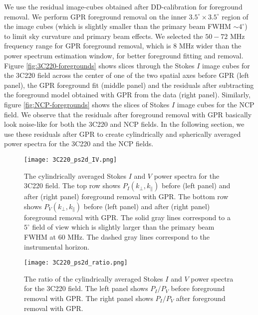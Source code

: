 \documentclass[fleqn,usenatbib]{mnras}
\begin{document}
We use the residual image-cubes obtained after DD-calibration for foreground removal. We perform GPR foreground removal on the inner $3.5^{\circ}\times 3.5^{\circ}$ region of the image cubes (which is slightly smaller than the primary beam FWHM $\sim 4^{\circ}$) to limit sky curvature and primary beam effects. We selected the $50-72$ MHz frequency range for GPR foreground removal, which is 8 MHz wider than the power spectrum estimation window, for better foreground fitting and removal. Figure \ref{fig:3C220-foregrounds} shows slices through the Stokes $I$ image cubes for the 3C220 field across the center of one of the two spatial axes before GPR (left panel), the GPR foreground fit (middle panel) and the residuals after subtracting the foreground model obtained with GPR from the data (right panel). Similarly, figure \ref{fig:NCP-foregrounds} shows the slices of Stokes $I$ image cubes for the NCP field. We observe that the residuals after foreground removal with GPR basically look noise-like for both the 3C220 and NCP fields. In the following section, we use these residuals after GPR to create cylindrically and spherically averaged power spectra for the 3C220 and the NCP fields.

\begin{figure*}
\centering
\texttt{[image: 3C220\_ps2d\_IV.png]}
    \caption{The cylindrically averaged Stokes $I$ and $V$ power spectra for the  3C220 field. The top row shows $P_{I}(k_{\perp},k_{\parallel})$ before (left panel) and after (right panel) foreground removal with GPR. The bottom row shows $P_{V}(k_{\perp},k_{\parallel})$ before (left panel) and after (right panel) foreground removal with GPR. The solid gray lines correspond to a $5^{\circ}$ field of view which is slightly larger than the primary beam FWHM at 60 MHz. The dashed gray lines correspond to the instrumental horizon.} 
\label{fig:3C220-ps2d_IV}
\end{figure*} 

\begin{figure*}
\centering
\texttt{[image: 3C220\_ps2d\_ratio.png]}
    \caption{The ratio of the cylindrically averaged Stokes $I$ and $V$ power spectra for the 3C220 field. The left panel shows $P_{I}/P_{V}$ before foreground removal with GPR. The right panel shows $P_{I}/P_{V}$ after foreground removal with GPR.} 
\label{fig:3C220-ps2d_ratio}
\end{figure*} 
\end{document}
